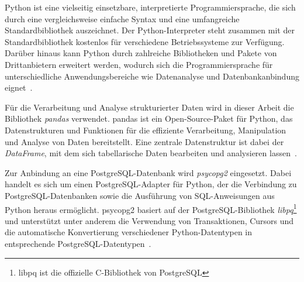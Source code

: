
Python ist eine vielseitig einsetzbare, interpretierte Programmiersprache, die sich durch eine vergleichsweise
einfache Syntax und eine umfangreiche Standardbibliothek auszeichnet.
Der Python-Interpreter steht zusammen mit der Standardbibliothek kostenlos für verschiedene Betriebssysteme
zur Verfügung.
Darüber hinaus kann Python durch zahlreiche Bibliotheken und Pakete von Drittanbietern erweitert werden, wodurch
sich die Programmiersprache für unterschiedliche Anwendungsbereiche wie Datenanalyse und Datenbankanbindung
eignet~\cite{PythonTutorial}.

Für die Verarbeitung und Analyse strukturierter Daten wird in dieser Arbeit die Bibliothek \emph{pandas} verwendet.
pandas ist ein Open-Source-Paket für Python, das Datenstrukturen und Funktionen für die effiziente Verarbeitung,
Manipulation und Analyse von Daten bereitstellt.
Eine zentrale Datenstruktur ist dabei der \emph{DataFrame}, mit dem sich tabellarische Daten bearbeiten und
analysieren lassen~\cite{Pandas}.

Zur Anbindung an eine PostgreSQL-Datenbank wird \emph{psycopg2} eingesetzt.
Dabei handelt es sich um einen PostgreSQL-Adapter für Python, der die Verbindung zu PostgreSQL-Datenbanken sowie die
Ausführung von SQL-Anweisungen aus Python heraus ermöglicht.
psycopg2 basiert auf der PostgreSQL-Bibliothek \emph{libpq}\footnote{libpq ist die offizielle C-Bibliothek von
	PostgreSQL} und unterstützt unter anderem die Verwendung von Transaktionen, Cursors und die automatische
Konvertierung verschiedener Python-Datentypen in entsprechende PostgreSQL-Datentypen~\cite{Psycopg2}.